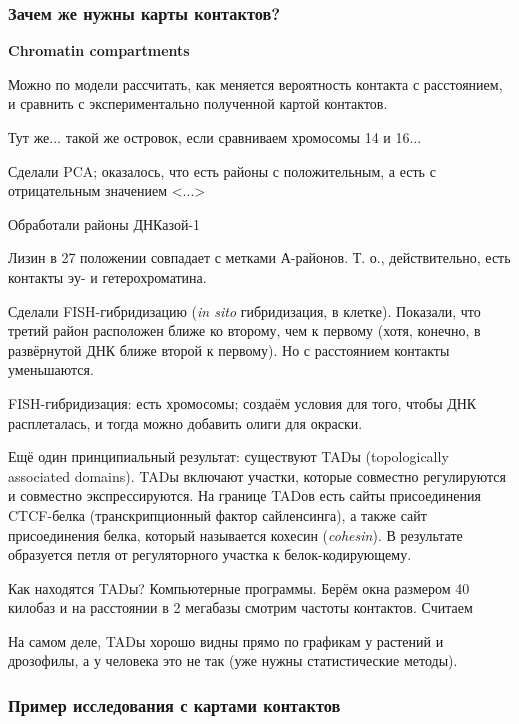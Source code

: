 \documentclass[main.tex]{subfiles}
\begin{document}
\subsubsection{Зачем же нужны карты контактов?}

\textbf{Chromatin compartments}

Можно по модели рассчитать, как меняется вероятность контакта с расстоянием, и сравнить с экспериментально полученной картой контактов.


Тут же... такой же островок, если сравниваем хромосомы 14 и 16...

Сделали  PCA; оказалось, что есть районы с положительным, а есть с отрицательным значением <...>

Обработали районы ДНКазой-1

Лизин в 27 положении совпадает с метками А-районов.
Т. о., действительно, есть контакты эу- и гетерохроматина.

Сделали FISH-гибридизацию (\textit{in sito} гибридизация, в клетке).
Показали, что третий район расположен ближе ко второму, чем к первому (хотя, конечно, в развёрнутой ДНК ближе второй к первому).
Но с расстоянием контакты уменьшаются.
\begin{leftbar}
FISH-гибридизация: есть хромосомы; создаём условия для того, чтобы ДНК расплеталась, и тогда можно добавить олиги для окраски.
\end{leftbar}

 
Ещё один принципиальный результат: существуют TADы (topologically associated domains).
TADы включают участки, которые совместно регулируются и совместно экспрессируются.
На границе  TADов есть сайты присоединения CTCF-белка (транскрипционный фактор сайленсинга), а также сайт присоединения белка, который называется кохесин (\emph{cohesin}).
В результате образуется петля от регуляторного участка к белок-кодирующему.
 
Как находятся TADы?
Компьютерные программы.
Берём окна размером 40 килобаз и на расстоянии в 2 мегабазы смотрим частоты контактов.
Считаем %
 
На самом деле, TADы хорошо видны прямо по графикам у растений и дрозофилы, а у человека это не так (уже нужны статистические методы).

\subsubsection{Пример исследования с картами контактов}
 
\end{document}
